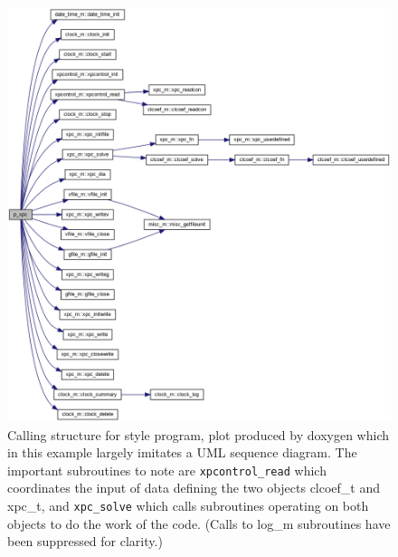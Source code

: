 \begin{figure}
\centerline{\includegraphics[width=12cm]{../pics/xpc}}
\caption{Calling structure for  style program, plot produced by doxygen
which in this example largely imitates a UML sequence diagram.
The important subroutines to note are {\tt xpcontrol\_read} which coordinates the input of data
defining the two objects clcoef\_t and xpc\_t, and {\tt xpc\_solve} which calls subroutines
operating on both objects to do the work of the code.
(Calls to log\_m subroutines have been suppressed for clarity.)
\label{fig:xpc}}
\end{figure}
